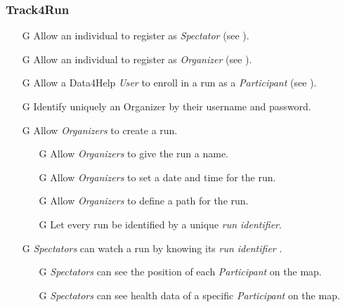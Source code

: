 \documentclass[../../rasd.tex]{subfiles}
\begin{document}
				\subsubsection{Track4Run}
					\begin{itemize}
						\item[G\subs{15}]Allow an individual to register as \textit{Spectator} (see ).
						\item[G\subs{16}]Allow an individual to register as \textit{Organizer} (see ).
						\item[G\subs{17}]Allow a Data4Help \textit{User} to enroll in a run as a \textit{Participant} (see ).
						\item[G\subs{18}]Identify uniquely an Organizer by their username and password.
						
						\item[G\subs{19}]Allow \textit{Organizers} to create a run.
						\begin{itemize}
							\item[G\subs{19.1}]Allow \textit{Organizers} to give the run a name.
							\item[G\subs{19.2}]Allow \textit{Organizers} to set a date and time for the run.
							\item[G\subs{19.3}]Allow \textit{Organizers} to define a path for the run.
							\item[G\subs{19.4}]Let every run be identified by a unique \textit{run identifier}.
						\end{itemize}

						\item[G\subs{20}]\textit{Spectators} can watch a run by knowing its \textit{run identifier} .
							\begin{itemize}
							\item[G\subs{20.1}]\textit{Spectators} can see the position of each \textit{Participant} on the map.
							\item[G\subs{20.2}]\textit{Spectators} can see health data of a specific \textit{Participant} on the map.
							\end{itemize}
					\end{itemize}
\end{document}

